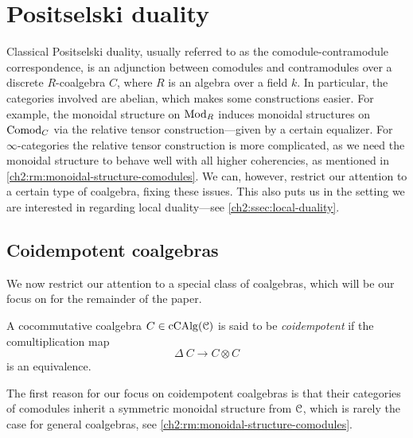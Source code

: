 
\section{Positselski duality}
\label{ch2:sec:positselski-duality}

Classical Positselski duality, usually referred to as the comodule-contramodule correspondence, is an adjunction between comodules and contramodules over a discrete $R$-coalgebra $C$, where $R$ is an algebra over a field $k$. In particular, the categories involved are abelian, which makes some constructions easier. For example, the monoidal structure on $\mathrm{Mod}_R$ induces monoidal structures on $\mathrm{Comod}_C$ via the relative tensor construction---given by a certain equalizer. For $\infty$-categories the relative tensor construction is more complicated, as we need the monoidal structure to behave well with all higher coherencies, as mentioned in \cref{ch2:rm:monoidal-structure-comodules}. We can, however, restrict our attention to a certain type of coalgebra, fixing these issues. This also puts us in the setting we are interested in regarding local duality---see \cref{ch2:ssec:local-duality}. 

\subsection{Coidempotent coalgebras}
\label{ch2:ssec:coidempotent-coalgebras}

We now restrict our attention to a special class of coalgebras, which will be our focus on for the remainder of the paper. 

\begin{definition}
    A cocommutative coalgebra $C\in \operatorname{cCAlg}(\EuScript{C})$ is said to be \emph{coidempotent} if the comultiplication map 
    \[\Delta\: C\to C\otimes C\] 
    is an equivalence. 
\end{definition}


The first reason for our focus on coidempotent coalgebras is that their categories of comodules inherit a symmetric monoidal structure from $\EuScript{C}$, which is rarely the case for general coalgebras, see \cref{ch2:rm:monoidal-structure-comodules}. 

